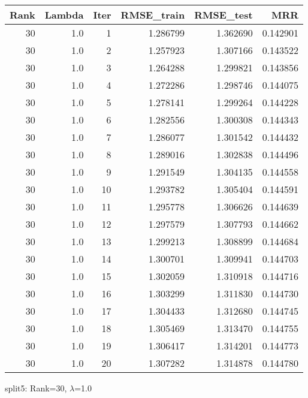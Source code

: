 \begin{tabular}{rrrrrr}
\toprule
 Rank &  Lambda &  Iter &  RMSE\_train &  RMSE\_test &       MRR \\
\midrule
   30 &     1.0 &     1 &    1.286799 &   1.362690 &  0.142901 \\
   30 &     1.0 &     2 &    1.257923 &   1.307166 &  0.143522 \\
   30 &     1.0 &     3 &    1.264288 &   1.299821 &  0.143856 \\
   30 &     1.0 &     4 &    1.272286 &   1.298746 &  0.144075 \\
   30 &     1.0 &     5 &    1.278141 &   1.299264 &  0.144228 \\
   30 &     1.0 &     6 &    1.282556 &   1.300308 &  0.144343 \\
   30 &     1.0 &     7 &    1.286077 &   1.301542 &  0.144432 \\
   30 &     1.0 &     8 &    1.289016 &   1.302838 &  0.144496 \\
   30 &     1.0 &     9 &    1.291549 &   1.304135 &  0.144558 \\
   30 &     1.0 &    10 &    1.293782 &   1.305404 &  0.144591 \\
   30 &     1.0 &    11 &    1.295778 &   1.306626 &  0.144639 \\
   30 &     1.0 &    12 &    1.297579 &   1.307793 &  0.144662 \\
   30 &     1.0 &    13 &    1.299213 &   1.308899 &  0.144684 \\
   30 &     1.0 &    14 &    1.300701 &   1.309941 &  0.144703 \\
   30 &     1.0 &    15 &    1.302059 &   1.310918 &  0.144716 \\
   30 &     1.0 &    16 &    1.303299 &   1.311830 &  0.144730 \\
   30 &     1.0 &    17 &    1.304433 &   1.312680 &  0.144745 \\
   30 &     1.0 &    18 &    1.305469 &   1.313470 &  0.144755 \\
   30 &     1.0 &    19 &    1.306417 &   1.314201 &  0.144773 \\
   30 &     1.0 &    20 &    1.307282 &   1.314878 &  0.144780 \\
\bottomrule
\end{tabular}

\caption{split5: Rank=30, $\lambda$=1.0}
